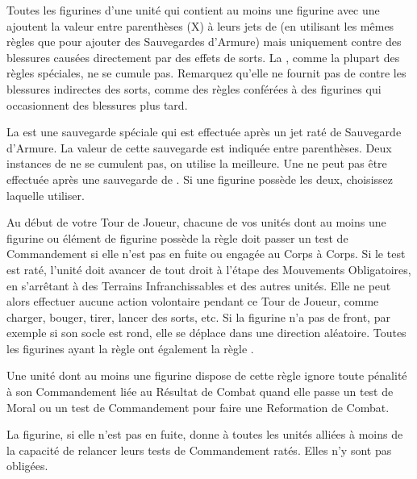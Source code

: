 \label{magicresistance}

Toutes les figurines d'une unité qui contient au moins une figurine avec une \magicresistance{} ajoutent la valeur entre parenthèses (X) à leurs jets de \wardsave{} (en utilisant les mêmes règles que pour ajouter des Sauvegardes d'Armure) mais uniquement contre des blessures causées directement par des effets de sorts. La \magicresistance{}, comme la plupart des règles spéciales, ne se cumule pas. Remarquez qu'elle ne fournit pas de \wardsave{} contre les blessures indirectes des sorts, comme des règles conférées à des figurines qui occasionnent des blessures plus tard.


La \wardsave{} est une sauvegarde spéciale qui est effectuée après un jet raté de Sauvegarde d'Armure. La valeur de cette sauvegarde est indiquée entre parenthèses. Deux instances de \wardsave{} ne se cumulent pas, on utilise la meilleure. Une \wardsave{} ne peut pas être effectuée après une sauvegarde de \regeneration{}. Si une figurine possède les deux, choisissez laquelle utiliser.


Au début de votre Tour de Joueur, chacune de vos unités dont au moins une figurine ou élément de figurine possède la règle \stupidity{} doit passer un test de Commandement si elle n'est pas en fuite ou engagée au Corps à Corps. Si le test est raté, l'unité doit avancer de  tout droit à l'étape des Mouvements Obligatoires, en s'arrêtant à  des Terrains Infranchissables et des autres unités. Elle ne peut alors effectuer aucune action volontaire pendant ce Tour de Joueur, comme charger, bouger, tirer, lancer des sorts, etc. Si la figurine n'a pas de front, par exemple si son socle est rond, elle se déplace dans une direction aléatoire. Toutes les figurines ayant la règle \stupidity{} ont également la règle \immunetopsychology{}.


Une unité dont au moins une figurine dispose de cette règle ignore toute pénalité à son Commandement liée au Résultat de Combat quand elle passe un test de Moral ou un test de Commandement pour faire une Reformation de Combat.


La figurine, si elle n'est pas en fuite, donne à toutes les unités alliées à moins de  la capacité de relancer leurs tests de Commandement ratés. Elles n'y sont pas obligées.


